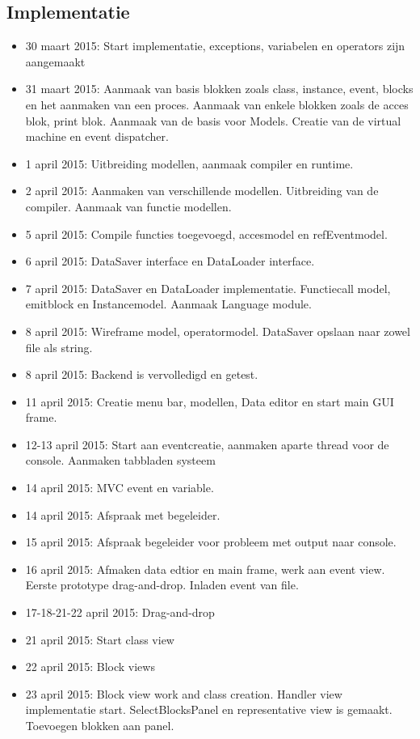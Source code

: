 \documentclass[]{article}
\begin{document}
\subsection{Implementatie}
\begin{itemize}
\item 30 maart 2015: Start implementatie, exceptions, variabelen en operators zijn aangemaakt
\item 31 maart 2015: Aanmaak van basis blokken zoals class, instance, event, blocks en het aanmaken van een proces.
			Aanmaak van enkele blokken zoals de acces blok, print blok. Aanmaak van de basis voor Models.
			Creatie van de virtual machine en event dispatcher.
\item 1  april 2015: Uitbreiding modellen, aanmaak compiler en runtime. 
\item 2 april 2015: Aanmaken van verschillende modellen. Uitbreiding van de compiler. Aanmaak van functie modellen.
\item 5 april 2015: Compile functies toegevoegd, accesmodel en refEventmodel.
\item 6 april 2015: DataSaver interface en DataLoader interface.
\item 7 april 2015: DataSaver en DataLoader implementatie. Functiecall model, emitblock en Instancemodel. Aanmaak Language module.
\item 8 april 2015: Wireframe model, operatormodel. DataSaver opslaan naar zowel file als string. 
\item 8 april 2015: Backend is vervolledigd en getest.
\item 11 april 2015: Creatie menu bar, modellen, Data editor en start main GUI frame.
\item 12-13 april 2015: Start aan eventcreatie, aanmaken aparte thread voor de console. Aanmaken tabbladen systeem
\item 14 april 2015: MVC event en variable.
\item 14 april 2015: Afspraak met begeleider.
\item 15 april 2015: Afspraak begeleider voor probleem met output naar console.
\item 16 april 2015: Afmaken data edtior en main frame, werk aan event view. Eerste prototype drag-and-drop. Inladen event van file.
\item 17-18-21-22 april 2015: Drag-and-drop
\item 21 april 2015: Start class view
\item 22 april 2015: Block views
\item 23 april 2015: Block view work and class creation. Handler view implementatie start. SelectBlocksPanel en representative view is gemaakt. Toevoegen blokken aan panel.

\end{itemize}
\end{document}
